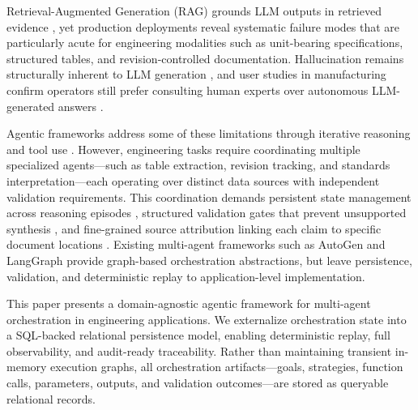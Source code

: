\documentclass[largeformat]{interact}
\begin{document}
Retrieval-Augmented Generation (RAG) grounds LLM outputs in retrieved evidence \cite{lewis2020rag}, yet production deployments reveal systematic failure modes
that are particularly acute for engineering modalities such as unit-bearing
specifications, structured tables, and revision-controlled documentation. Hallucination remains structurally inherent to LLM generation \cite{huang2025hallucinationsurvey, kalai2025hallucinate}, and user studies in manufacturing confirm operators still prefer consulting human experts over autonomous LLM-generated answers \cite{kernanfreire2024knowledge}.

Agentic frameworks address some of these limitations through iterative reasoning and tool use \cite{yao2023reactsynergizingreasoningacting, wang2024autonomousagents}. However, engineering tasks require coordinating multiple specialized agents—such as table extraction, revision tracking, and standards interpretation—each operating over distinct data sources with independent validation requirements. This coordination demands persistent state management across reasoning episodes \cite{packer2023memgpt}, structured validation gates that prevent unsupported synthesis \cite{madaan2023selfrefine}, and fine-grained source attribution linking each claim to specific document locations \cite{rashkin2023attribution}. Existing multi-agent frameworks such as AutoGen \cite{wu2024autogen} and LangGraph provide graph-based orchestration abstractions, but leave persistence, validation, and deterministic replay to application-level implementation.

This paper presents a domain-agnostic agentic framework for multi-agent orchestration in engineering applications. We externalize orchestration state into a SQL-backed relational persistence model, enabling deterministic replay, full observability, and audit-ready traceability. Rather than maintaining transient in-memory execution graphs, all orchestration artifacts—goals, strategies, function calls, parameters, outputs, and validation outcomes—are stored as queryable relational records.
\end{document}
